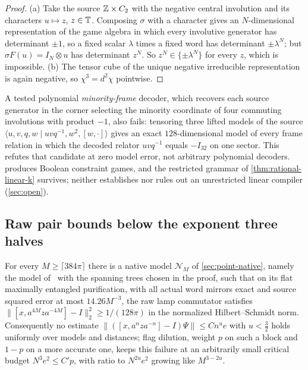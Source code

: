 \begin{proof}
(a) Take the source $\mathbb Z\times C_2$ with the negative central involution and its characters $u\mapsto z$, $z\in\mathbb T$. Composing $\sigma$
with a character gives an $N$-dimensional representation of the game algebra in which every involutive generator has determinant
$\pm1$, so a fixed scalar $\lambda$ times a fixed word has determinant $\pm\lambda^N$; but $\sigma F(u)=I_N\otimes u$ has determinant $z^N$.
So $z^N\in\{\pm\lambda^N\}$ for every $z$, which is impossible. (b) The tensor cube of the unique negative irreducible representation
is again negative, so $\chi^3=d^2\chi$ pointwise.
\end{proof}

A tested polynomial \emph{minority-frame} decoder, which recovers each source generator in the corner selecting the minority
coordinate of four commuting involutions with product $-1$, also fails: tensoring three lifted models of the source
$\langle u,v,q,w\mid uvq^{-1},w^2,[w,\cdot]\rangle$ gives an exact $128$-dimensional model of every frame relation in which the decoded
relator $uvq^{-1}$ equals $-I_{32}$ on one sector. This refutes that candidate at zero model error, not arbitrary polynomial
decoders.  produces Boolean constraint games, and the restricted grammar of \cref{thm:rational-linear-k} survives; neither establishes
nor rules out an unrestricted linear compiler (\cref{sec:open}).

\subsection{Raw pair bounds below the exponent three halves}\label{sec:raw-pairs}

\begin{proposition}\label{prop:raw-pairs}
For every $M\ge\lceil384\pi\rceil$ there is a native model $\mathcal N_M$ of \cref{sec:point-native}, namely the model
of~\cite[Proposition~6.5]{DM-H3} with the spanning trees chosen in the proof, such that on its flat maximally entangled
purification, with all actual word mirrors exact and source squared error at most $14.26M^{-3}$, the raw lamp commutator satisfies
$\|[x,a^{4M}za^{-4M}]-I\|_2^2\ge1/(128\pi)$ in the normalized Hilbert--Schmidt norm. Consequently no estimate
$\|([x,a^nza^{-n}]-I)\Psi\|\le Cn^ue$ with $u<\frac32$ holds uniformly over models and distances; flag dilution, weight $p$ on such a
block and $1-p$ on a more accurate one, keeps this failure at an arbitrarily small critical budget $N^3e^2\le C'p$, with ratio to
$N^{2u}e^2$ growing like $M^{3-2u}$.
\end{proposition}

